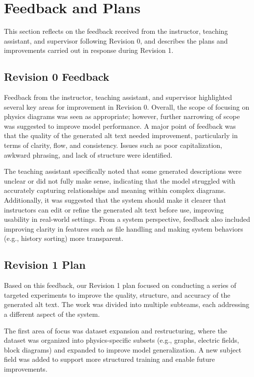\documentclass[11pt]{article}
\begin{document}
\section{Feedback and Plans}

This section reflects on the feedback received from the instructor, teaching assistant, and supervisor following Revision 0, and describes the plans and improvements carried out in response during Revision 1.

\subsection{Revision 0 Feedback} 
Feedback from the instructor, teaching assistant, and supervisor highlighted several key areas for improvement in Revision 0. 
Overall, the scope of focusing on physics diagrams was seen as appropriate; however, further narrowing of scope was suggested 
to improve model performance. A major point of feedback was that the quality of the generated alt text needed improvement, 
particularly in terms of clarity, flow, and consistency. Issues such as poor capitalization, awkward phrasing, and lack of structure were identified.

The teaching assistant specifically noted that some generated descriptions were unclear or did not fully make sense, indicating 
that the model struggled with accurately capturing relationships and meaning within complex diagrams. Additionally, it 
was suggested that the system should make it clearer that instructors can edit or refine the generated alt text before use, 
improving usability in real-world settings. From a system perspective, feedback also included improving clarity in features such as 
file handling and making system behaviors (e.g., history sorting) more transparent.

\subsection{Revision 1 Plan} 
Based on this feedback, our Revision 1 plan focused on conducting a series of targeted experiments to 
improve the quality, structure, and accuracy of the generated alt text. The work was divided into multiple 
subteams, each addressing a different aspect of the system.

The first area of focus was dataset expansion and restructuring, where the dataset was organized into 
physics-specific subsets (e.g., graphs, electric fields, block diagrams) and expanded to improve model generalization. 
A new subject field was added to support more structured training and enable future improvements.
\end{document}
